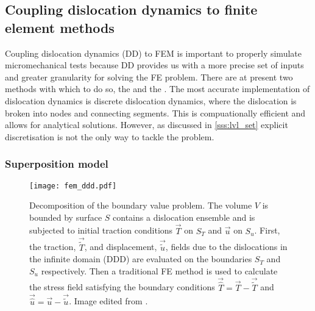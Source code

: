 \subsection{Coupling dislocation dynamics to finite element methods}
\label{ss:ddd_fem}
Coupling dislocation dynamics (DD) to FEM is important to properly simulate micromechanical tests because DD provides us with a more precise set of inputs and greater granularity for solving the FE problem. There are at present two methods with which to do so, the  and the . The most accurate implementation of dislocation dynamics is discrete dislocation dynamics, where the dislocation is broken into nodes and connecting segments. This is compuationally efficient and allows for analytical solutions. However, as discussed in \cref{sss:lvl_set} explicit discretisation is not the only way to tackle the problem.

\subsubsection{Superposition model}
\label{sss:superposition}
\begin{figure}
    \centering
    \texttt{[image: fem\_ddd.pdf]}
    \caption[Superposition Model for DDD-FEM coupling.]{Decomposition of the boundary value problem. The volume $ V $ is bounded by surface $ S $ contains a dislocation ensemble and is subjected to initial traction conditions $ \vec{T} $ on $ S_{T} $ and $ \vec{u} $ on $ S_{u} $. First, the traction, $ \vec{\tilde{T}} $, and displacement, $\vec{\tilde{u}}$, fields due to the dislocations in the infinite domain (DDD) are evaluated on the boundaries $ S_{T} $ and $ S_{u} $ respectively. Then a traditional FE method is used to calculate the stress field satisfying the boundary conditions $ \vec{\hat{T}} = \vec{T} - \vec{\tilde{T}} $ and $ \vec{\hat{u}} = \vec{u} - \vec{\tilde{u}} $. Image edited from \cite{analytic_tractions}.}
    \label{f:fem_ddd}
\end{figure}

